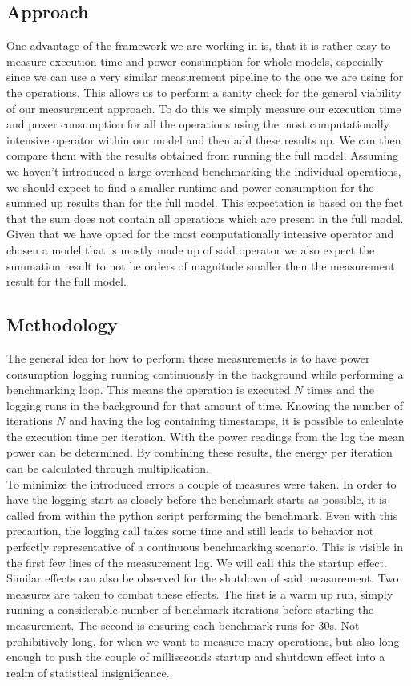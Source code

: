 \documentclass[conference]{IEEEtran}
\begin{document}
\subsection{Approach}
One advantage of the framework we are working in is, that it is rather easy to measure execution time and power consumption for whole models, especially since we can use a very similar measurement pipeline to the one we are using for the operations. This allows us to perform a sanity check for the general viability of our measurement approach. To do this we simply measure our execution time and power consumption for all the operations using the most computationally intensive operator within our model and then add these results up. We can then compare them with the results obtained from running the full model. Assuming we haven’t introduced a large overhead benchmarking the individual operations, we should expect to find a smaller runtime and power consumption for the summed up results than for the full model. This expectation is based on the fact that the sum does not contain all operations which are present in the full model. Given that we have opted for the most computationally intensive operator and chosen a model that is mostly made up of said operator we also expect the summation result to not be orders of magnitude smaller then the measurement result for the full model. 

\subsection{Methodology}
The general idea for how to perform these measurements is to have power consumption logging running continuously in the background while performing a benchmarking loop. This means the operation is executed $N$ times and the logging runs in the background for that amount of time. Knowing the number of iterations $N$ and having the log containing timestamps, it is possible to calculate the execution time per iteration. With the power readings from the log the mean power can be determined. By combining these results, the energy per iteration can be calculated through multiplication. \\
To minimize the introduced errors a couple of measures were taken. In order to have the logging start as closely before the benchmark starts as possible, it is called from within the python script performing the benchmark. Even with this precaution, the logging call takes some time and still leads to behavior not perfectly representative of a continuous benchmarking scenario. This is visible in the first few lines of the measurement log. We will call this the startup effect. Similar effects can also be observed for the shutdown of said measurement. Two measures are taken to combat these effects. The first is a warm up run, simply running a considerable number of benchmark iterations before starting the measurement. The second is ensuring each benchmark runs for 30s. Not prohibitively long, for when we want to measure many operations, but also long enough to push the couple of milliseconds startup and shutdown effect into a realm of statistical insignificance.
\end{document}
